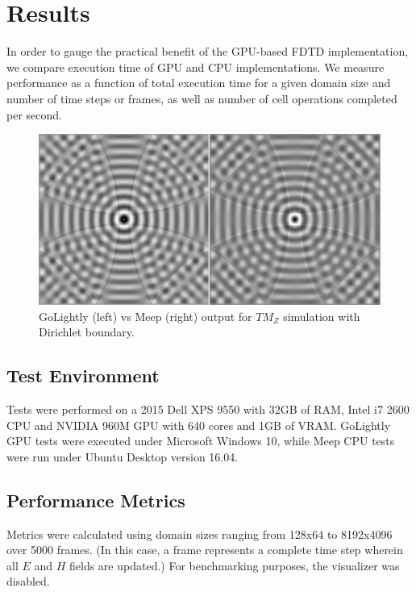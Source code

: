 \chapter{Results} \label{ch:conclusions}

In order to gauge the practical benefit of the GPU-based FDTD implementation, we compare execution time  of GPU and CPU implementations. We measure performance as a function of total execution time for a given domain size and number of time steps or frames, as well as number of cell operations completed per second. 

\begin{figure}[H]
	\centering
	\includegraphics[width=\textwidth,keepaspectratio]{point-source-comparison.jpg}
	\caption{GoLightly (left) vs Meep (right) output for ${TM}_Z$ simulation with Dirichlet boundary.}
	\label{fig:pointSourceComparison}
\end{figure}

\section{Test Environment}

Tests were performed on a 2015 Dell XPS 9550 with 32GB of RAM, Intel i7 2600 CPU and NVIDIA 960M GPU with 640 cores and 1GB of VRAM. GoLightly GPU tests were executed under Microsoft Windows 10, while Meep CPU tests were run under Ubuntu Desktop version 16.04.
 

\section{Performance Metrics}

Metrics were calculated using domain sizes ranging from 128x64 to 8192x4096 over 5000 frames. (In this case, a frame represents a complete time step wherein all $E$ and $H$ fields are updated.) For benchmarking purposes, the visualizer was disabled.


